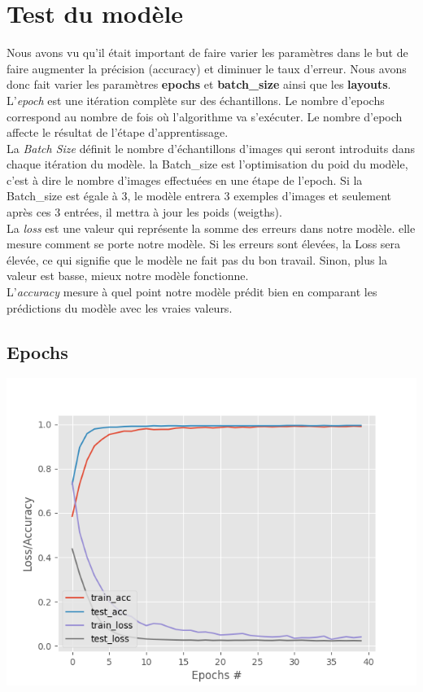 \clearpage
\section{Test du modèle}

Nous avons vu qu’il était important de faire varier les paramètres dans le but de faire augmenter la précision (accuracy) et diminuer le taux d’erreur.
Nous avons donc fait varier les paramètres \textbf{epochs} et \textbf{batch\_size} ainsi que les \textbf{layouts}.\\

L'\textit{epoch} est une itération complète sur des échantillons. Le nombre d'epochs correspond au nombre de fois où l'algorithme va s'exécuter. Le nombre d'epoch affecte le résultat de l'étape d'apprentissage.\\

La \textit{Batch Size} définit le nombre d'échantillons d'images qui seront introduits dans chaque itération du modèle. la Batch\_size est l'optimisation du poid du modèle, c'est à dire le nombre d'images effectuées en une étape de l'epoch. Si la Batch\_size est égale à 3, le modèle entrera 3 exemples d'images et seulement après ces 3 entrées, il mettra à jour les poids (weigths).\\


La \textit{loss} est une valeur qui représente la somme des erreurs dans notre modèle. elle mesure comment se porte notre modèle. Si les erreurs sont élevées, la Loss sera élevée, ce qui signifie que le modèle ne fait pas du bon travail. Sinon, plus la valeur est basse, mieux notre modèle fonctionne.\\

L'\textit{accuracy} mesure à quel point notre modèle prédit bien en comparant les prédictions du modèle avec les vraies valeurs.

\subsection{Epochs}
\begin{center}
    \includegraphics[scale=0.59]{resources/loss-accuracy.png}
\end{center}


